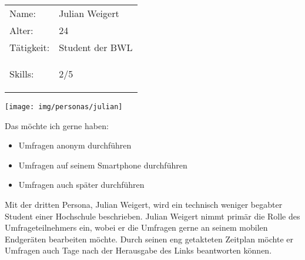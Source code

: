 
%
\newpage
{}
\begin{minipage}[t]{0.5\textwidth}
	\vspace{-3.6cm}
	\renewcommand{\arraystretch}{1.5}
	\begin{tabular}{l l}
		Name: & Julian Weigert \\
		Alter: & 24 \\
		Tätigkeit: & Student der BWL \\
		Skills: & 2/5 \hspace{-1cm} \begin{barchart}{5.0}
			\baritemNL{}{2}
		\end{barchart} \\
	\end{tabular}
\end{minipage}
\hfill
\begin{minipage}[t]{0.4\textwidth}
	\flushright
	\texttt{[image: img/personas/julian]}
\end{minipage}
\autocite{rf-unsplash-student}

Das möchte ich gerne haben:
\begin{itemize}
	\item Umfragen anonym durchführen
    \item Umfragen auf seinem Smartphone durchführen
    \item Umfragen auch später durchführen
\end{itemize}

Mit der dritten Persona, Julian Weigert, wird ein technisch weniger begabter Student einer Hochschule beschrieben.
Julian Weigert nimmt primär die Rolle des Umfrageteilnehmers ein, wobei er die Umfragen gerne an seinem mobilen Endgeräten bearbeiten möchte.
Durch seinen eng getakteten Zeitplan möchte er Umfragen auch Tage nach der Herausgabe des Links beantworten können.
